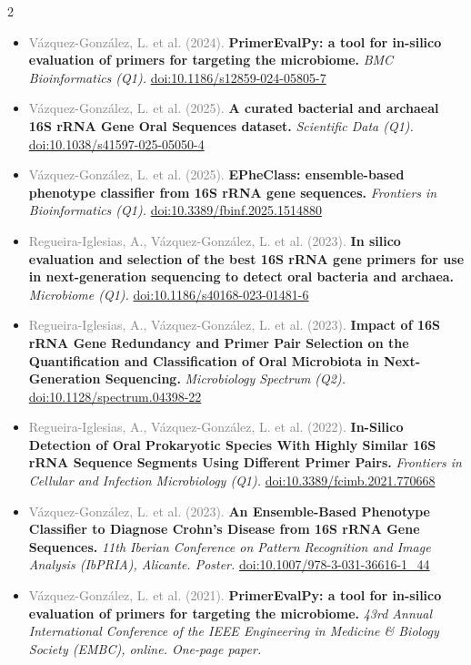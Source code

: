 \documentclass[10pt, a4paper]{article}
\newcommand{\mainsection}[1]{%
  \vspace{9pt}{\large\bfseries\color{accent}#1}\par
  \vspace{2pt}{\color{rulegray}\hrule}\vspace{5pt}}
\newcommand{\cvpub}[5]{%
  \item \textcolor{gray}{\small #1 (#2).} \textbf{\small #3.} \textit{\small #4.} \textcolor{lightaccent}{\small #5}}
\begin{document}
\begin{paracol}{2}
\mainsection{Publications}
{\sloppy
\begin{itemize}[itemsep=3pt]
  \cvpub{V\'azquez-Gonz\'alez, L. et al.}{2024}{PrimerEvalPy: a tool for in-silico evaluation of primers for targeting the microbiome}{BMC Bioinformatics (Q1)}{\href{https://doi.org/10.1186/s12859-024-05805-7}{doi:10.1186/s12859-024-05805-7}}
  \cvpub{V\'azquez-Gonz\'alez, L. et al.}{2025}{A curated bacterial and archaeal 16S rRNA Gene Oral Sequences dataset}{Scientific Data (Q1)}{\href{https://doi.org/10.1038/s41597-025-05050-4}{doi:10.1038/s41597-025-05050-4}}
  \cvpub{V\'azquez-Gonz\'alez, L. et al.}{2025}{EPheClass: ensemble-based phenotype classifier from 16S rRNA gene sequences}{Frontiers in Bioinformatics (Q1)}{\href{https://doi.org/10.3389/fbinf.2025.1514880}{doi:10.3389/fbinf.2025.1514880}}
  \cvpub{Regueira-Iglesias, A., V\'azquez-Gonz\'alez, L. et al.}{2023}{In silico evaluation and selection of the best 16S rRNA gene primers for use in next-generation sequencing to detect oral bacteria and archaea}{Microbiome (Q1)}{\href{https://doi.org/10.1186/s40168-023-01481-6}{doi:10.1186/s40168-023-01481-6}}
  \cvpub{Regueira-Iglesias, A., V\'azquez-Gonz\'alez, L. et al.}{2023}{Impact of 16S rRNA Gene Redundancy and Primer Pair Selection on the Quantification and Classification of Oral Microbiota in Next-Generation Sequencing}{Microbiology Spectrum (Q2)}{\href{https://doi.org/10.1128/spectrum.04398-22}{doi:10.1128/spectrum.04398-22}}
  \cvpub{Regueira-Iglesias, A., V\'azquez-Gonz\'alez, L. et al.}{2022}{In-Silico Detection of Oral Prokaryotic Species With Highly Similar 16S rRNA Sequence Segments Using Different Primer Pairs}{Frontiers in Cellular and Infection Microbiology (Q1)}{\href{https://doi.org/10.3389/fcimb.2021.770668}{doi:10.3389/fcimb.2021.770668}}
\end{itemize}
}

\mainsection{Conferences}
{\sloppy
\begin{itemize}[itemsep=3pt]
  \cvpub{V\'azquez-Gonz\'alez, L. et al.}{2023}{An Ensemble-Based Phenotype Classifier to Diagnose Crohn's Disease from 16S rRNA Gene Sequences}{11th Iberian Conference on Pattern Recognition and Image Analysis (IbPRIA), Alicante. Poster}{\href{https://doi.org/10.1007/978-3-031-36616-1_44}{doi:10.1007/978-3-031-36616-1\_44}}
  \cvpub{V\'azquez-Gonz\'alez, L. et al.}{2021}{PrimerEvalPy: a tool for in-silico evaluation of primers for targeting the microbiome}{43rd Annual International Conference of the IEEE Engineering in Medicine \& Biology Society (EMBC), online. One-page paper}{}
\end{itemize}
}

\end{paracol}
\end{document}
